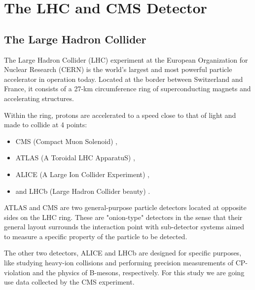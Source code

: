 %
%
%
%

\chapter{The LHC and CMS Detector}
\section{The Large Hadron Collider}

The Large Hadron Collider (LHC) \cite{Breskin:1244506} experiment at the European Organization for Nuclear Research (CERN) is the world's largest and most powerful particle accelerator in operation today. Located at the border between Switzerland and France, it consists of a 27-km circumference ring of superconducting magnets and accelerating structures.

Within the ring, protons are accelerated to a speed close to that of light and made to collide at 4 points:

\begin{itemize}
\item CMS (Compact Muon Solenoid) \cite{Chatrchyan:2008aa},
\item ATLAS (A Toroidal LHC ApparatuS) \cite{1748-0221-3-08-S08003},
\item ALICE (A Large Ion Collider Experiment) \cite{Aamodt:2008zz},
\item and LHCb (Large Hadron Collider beauty) \cite{Alves:2008zz}.
\end{itemize}

ATLAS and CMS are two general-purpose particle detectors located at opposite sides on the LHC ring. These are "onion-type" detectors in the sense that their general layout surrounds the interaction point with sub-detector systems aimed to measure a specific property of the particle to be detected.

The other two detectors, ALICE and LHCb are designed for specific purposes, like studying heavy-ion collisions and performing precision measurements of CP-violation and the physics of B-mesons, respectively. For this study we are going use data collected by the CMS experiment.

